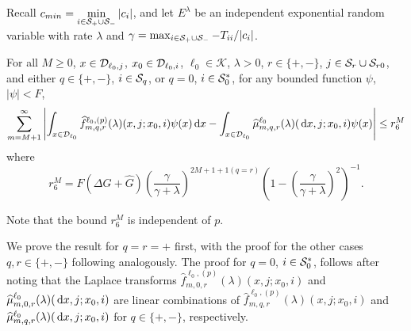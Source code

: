 Recall \(c_{min} = \min\limits_{i\in\mathcal S_{+}\cup\mathcal{S}_-} |c_i|\), and let \(E^\lambda\) be an independent exponential random variable with rate \(\lambda\) and \(\gamma = \max_{i\in\mathcal{S}_+\cup\mathcal{S}_-}-T_{ii}/|c_i|\). 
\begin{lem}\label{lem: gkjljklgagjklagsjlk}For all \(M\geq 0\), \(x\in\mathcal{D}_{\ell_0,j}\), \(x_0\in\mathcal{D}_{\ell_0,i}\), \(\ell_0\in\mathcal K\), \(\lambda > 0\), \(r\in\{+,-\}\), \(j\in\mathcal{S}_r\cup\mathcal{S}_{r0}\), and either \(q\in\{+,-\}\), \(i\in\mathcal{S}_q\), or \(q=0\), \(i\in\mathcal{S}_0^*\), for any bounded function \(\psi\), \(|\psi|<F\), 
	\begin{align}
		\sum_{m=M+1}^\infty \left| \int_{x\in\mathcal{D}_{\ell_0}} \widehat f^{\ell_0,(p)}_{m,q,r}(\lambda)(x,j;x_0,i)\psi(x)\, \mathrm{d} x
		-
		\int_{x\in\mathcal{D}_{\ell_0}} \widehat \mu^{\ell_0}_{m,q,r}(\lambda)(\, \mathrm{d} x,j;x_0,i)\psi(x) \right| \leq r_6^M
	\end{align} 
	where 
	\[r_6^M =  F(\Delta G + \widehat G)\left(\frac{\gamma}{\gamma+\lambda}\right)^{2M+1+1(q=r)} \left(1-\left(\frac{\gamma}{\gamma+\lambda}\right)^2\right)^{-1} .\]
\end{lem}
Note that the bound \(r_6^M\) is independent of \(p\). 

We prove the result for \(q=r=+\) first, with the proof for the other cases \(q,r\in\{+,-\}\) following analogously. The proof for \(q=0\), \(i\in\mathcal{S}_0^*\), follows after noting that the Laplace transforms \(\widehat f^{\ell_0,(p)}_{m,0,r}(\lambda)(x,j;x_0,i)\) and \(\widehat \mu^{\ell_0}_{m,0,r}(\lambda)(\, \mathrm{d} x,j;x_0,i)\) are linear combinations of \(\widehat f^{\ell_0,(p)}_{m,q,r}(\lambda)(x,j;x_0,i)\) and \(\widehat \mu^{\ell_0}_{m,q,r}(\lambda)(\, \mathrm{d} x,j;x_0,i)\) for \(q\in\{+,-\}\), respectively. 


